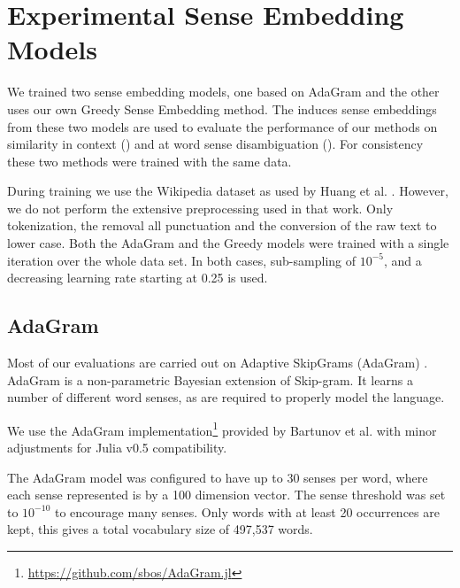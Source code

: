 \documentclass{sig-alternate}
\begin{document}
\section{Experimental Sense Embedding Models}
We trained two sense embedding models, one based on AdaGram \parencite{AdaGrams} 
and the other uses our own Greedy Sense Embedding method. 
The induces sense embeddings from these two models are used to evaluate the performance of our methods on similarity in context () and at word sense disambiguation (). For consistency these two methods were trained with the same data.

During training we use the Wikipedia dataset as used by Huang et al. \parencite{Huang2012}.
However, we do not perform the extensive preprocessing used in that work.
Only tokenization, the removal all punctuation and the conversion of the raw text to lower case.
Both the AdaGram and the Greedy models were trained with a single iteration over the whole data set.
In both cases, sub-sampling of $10^{-5}$, and a decreasing learning rate starting at 0.25 is used.

\subsection{AdaGram}
Most of our evaluations are carried out on Adaptive SkipGrams (AdaGram) \parencite{AdaGrams}. AdaGram is a non-parametric Bayesian extension of Skip-gram. It learns a number of different word senses, as are required to properly model the language.

We use the AdaGram  implementation\footnote{\url{https://github.com/sbos/AdaGram.jl}} provided by Bartunov et al. \parencite{AdaGrams} with minor adjustments for Julia \parencite{Julia} v0.5 compatibility.


The AdaGram model was configured to have up to 30 senses per word, where each sense represented is by a 100 dimension vector. 
The sense threshold was set to $10^{-10}$ to encourage many senses.
Only words with at least 20 occurrences are kept, this gives a total vocabulary size of 497,537 words.




\end{document}
